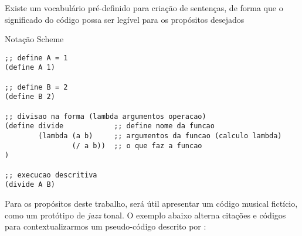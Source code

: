 Existe um vocabulário pré-definido para criação de sentenças, de forma que o significado do código possa ser legível para os propósitos desejados

\begin{example}{Notação Scheme}
\begin{verbatim}
;; define A = 1
(define A 1)

;; define B = 2
(define B 2)

;; divisao na forma (lambda argumentos operacao) 
(define divide            ;; define nome da funcao
        (lambda (a b)     ;; argumentos da funcao (calculo lambda)
                (/ a b))  ;; o que faz a funcao
)

;; execucao descritiva
(divide A B)
\end{verbatim}
\end{example}

Para os propósitos deste trabalho, será útil apresentar um código musical fictício, como um protótipo de \emph{jazz} tonal. O exemplo abaixo alterna citações e códigos para contextualizarmos um pseudo-código descrito por :

